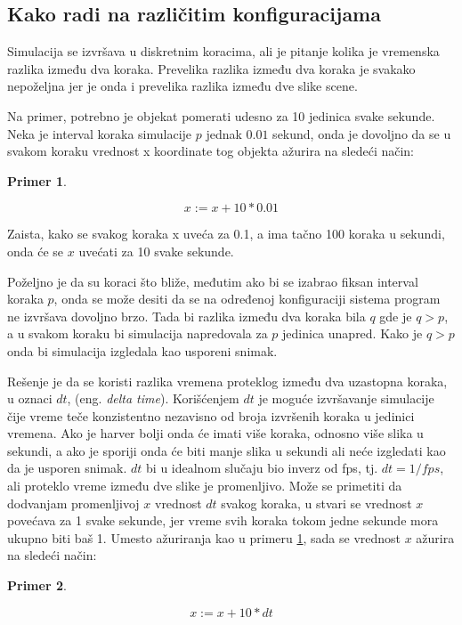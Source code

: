 \documentclass{article}
\newtheorem{primer}{Primer}[section]
\begin{document}
{\subsection{Kako radi na različitim konfiguracijama}

Simulacija se izvršava u diskretnim koracima, ali je pitanje kolika je vremenska razlika između dva koraka.
Prevelika razlika između dva koraka je svakako nepoželjna jer je onda i prevelika razlika između dve slike scene.

Na primer, potrebno je objekat pomerati udesno za 10 jedinica svake sekunde. Neka je interval koraka simulacije 
$p$ jednak $0.01$ sekund, onda je dovoljno da se u svakom koraku vrednost x koordinate tog objekta ažurira na sledeći način:

\begin{primer}
\label{pr:x}

$$ x:= x + 10 * 0.01 $$
\end{primer}

Zaista, kako se svakog koraka x uveća za 0.1, a ima tačno 100 koraka u sekundi, onda će se $x$ uvećati za 10 svake sekunde.

Poželjno je da su koraci što bliže, međutim ako bi se izabrao fiksan interval koraka $p$, onda se može desiti
da se na određenoj konfiguraciji sistema program ne izvršava dovoljno brzo. 
Tada bi razlika između dva koraka bila $q$ gde je $q > p$, a u svakom koraku bi simulacija napredovala za 
$p$ jedinica unapred. Kako je $q > p$ onda bi simulacija izgledala kao usporeni snimak.

Rešenje je da se koristi razlika vremena proteklog između dva uzastopna koraka, u oznaci $dt$, (eng. {\em delta time}).
Korišćenjem $dt$ je moguće izvršavanje simulacije čije vreme teče konzistentno nezavisno od broja izvršenih koraka u 
jedinici vremena. Ako je harver bolji onda će imati više koraka, odnosno više slika u sekundi, a ako je 
sporiji onda će biti manje slika u sekundi ali neće izgledati kao da je usporen snimak.
$dt$ bi u idealnom slučaju bio inverz od fps, tj. $dt = 1/fps$, ali proteklo vreme između dve slike je promenljivo.
Može se primetiti da dodvanjam promenljivoj $x$ vrednost $dt$ svakog koraka, u stvari se vrednost $x$ povećava 
za 1 svake sekunde, jer vreme svih koraka tokom jedne sekunde mora ukupno biti baš 1.
Umesto ažuriranja kao u primeru \ref{pr:x}, sada se vrednost $x$ ažurira na sledeći način:
\begin{primer}
	\label{pr:x2}
	
	$$ x:= x + 10 * dt $$
\end{primer}

}
\end{document}
